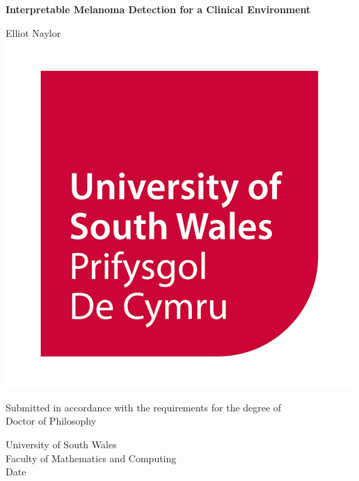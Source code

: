 \begin{titlepage}
    \begin{center}
        \vspace*{1cm}
        
        \Large{\textbf{Interpretable Melanoma Detection for a Clinical Environment}}
        
        \vspace{2cm}
        \normalsize
        Elliot Naylor
        \vfill
        \includegraphics[scale=0.4]{images/USW-logo.jpg}

       Submitted in accordance with the requirements for the degree of \\
       Doctor of Philosophy
        
        \vspace{0.8cm}
        
    
        University of South Wales\\
        Faculty of Mathematics and Computing\\
     \hfill\break
        Date
        
    \end{center}
\end{titlepage}
